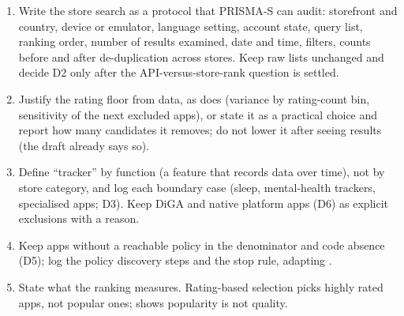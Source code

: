 \begin{thesisbox}
\begin{enumerate}[leftmargin=1.3em]
\item Write the store search as a protocol that PRISMA-S can audit: storefront and country, device or emulator, language setting, account state, query list, ranking order, number of results examined, date and time, filters, counts before and after de-duplication across stores. Keep raw lists unchanged and decide D2 only after the API-versus-store-rank question is settled.
\item Justify the rating floor from data, as  does (variance by rating-count bin, sensitivity of the next excluded apps), or state it as a practical choice and report how many candidates it removes; do not lower it after seeing results (the draft already says so).
\item Define ``tracker'' by function (a feature that records data over time), not by store category, and log each boundary case (sleep, mental-health trackers, specialised apps; D3). Keep DiGA and native platform apps (D6) as explicit exclusions with a reason.
\item Keep apps without a reachable policy in the denominator and code absence (D5); log the policy discovery steps and the stop rule, adapting .
\item State what the ranking measures. Rating-based selection picks highly rated apps, not popular ones;  shows popularity is not quality.
\end{enumerate}
\end{thesisbox}
